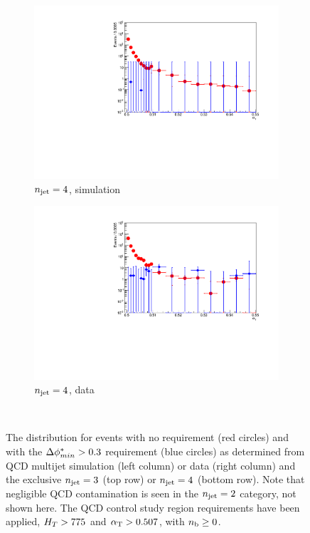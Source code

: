 \begin{figure}[h!]
\begin{subfigure}[b]{0.46\textwidth}
    \includegraphics[width=\textwidth]{Figs/dphi/chris2/qcd_mc/dphi_incl/v2/dphi_eq4j_ge0b_775}
    \caption{$n_{\text{jet}} = 4$, simulation}
    \label{fig:dphi_acceptance_sim_4j}
  \end{subfigure}
  \begin{subfigure}[b]{0.46\textwidth}
    \includegraphics[width=\textwidth]{Figs/dphi/chris2/data/dphi_incl/v2/dphi_eq4j_ge0b_775}
    \caption{$n_{\text{jet}} = 4$, data}
    \label{fig:dphi_acceptance_data_4j}
  \end{subfigure}\\
  \caption{The \alphat distribution for events with no \mindphistar
    requirement (red circles) and with the $\Delta \phi^*_{min} > 0.3$
    requirement (blue circles) as determined from QCD multijet
    simulation (left column) or data (right column) and the exclusive
    $n_{\text{jet}} =3$
    (top row) or $n_{\text{jet}} = 4$ (bottom row). Note that negligible QCD contamination
    is seen in the $n_{\text{jet}} = 2$ category, not shown here. The QCD control study
    region requirements have been applied, $H_T > 775$ \gev and $\alpha_{\text{T}} >
    0.507$, with $n_{\text{b}} \geq 0$.}
    \label{fig:data_pred_dphistar_eff}
\end{figure}

